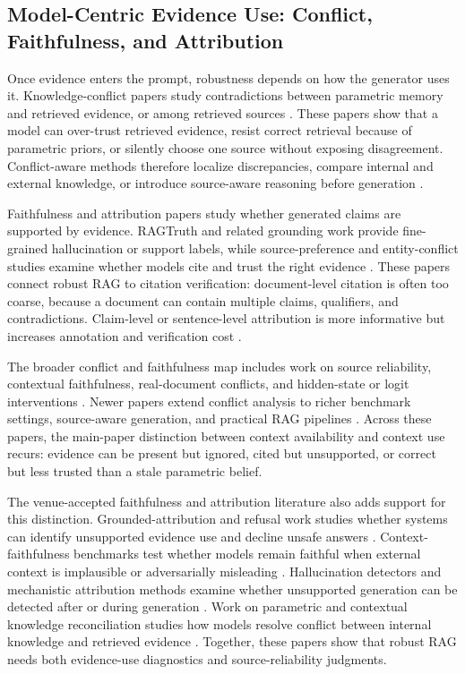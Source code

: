 \documentclass[11pt]{article}
\begin{document}
\subsection{Model-Centric Evidence Use: Conflict, Faithfulness, and Attribution}

Once evidence enters the prompt, robustness depends on how the generator uses it. Knowledge-conflict papers study contradictions between parametric memory and retrieved evidence, or among retrieved sources \citep{tugOfWar2024,faithfulRAG2025,astuteRAG2025,rrag046}. These papers show that a model can over-trust retrieved evidence, resist correct retrieval because of parametric priors, or silently choose one source without exposing disagreement. Conflict-aware methods therefore localize discrepancies, compare internal and external knowledge, or introduce source-aware reasoning before generation \citep{rrag008,rrag013,rrag017,rrag024,rrag029,rrag031,rrag036,rrag038}.

Faithfulness and attribution papers study whether generated claims are supported by evidence. RAGTruth and related grounding work provide fine-grained hallucination or support labels, while source-preference and entity-conflict studies examine whether models cite and trust the right evidence \citep{ragTruth2024,rrag110,rrag112,rrag115,rrag132}. These papers connect robust RAG to citation verification: document-level citation is often too coarse, because a document can contain multiple claims, qualifiers, and contradictions. Claim-level or sentence-level attribution is more informative but increases annotation and verification cost \citep{rrag076,rrag077,rrag082,rrag086,rrag089,rrag092,rrag100}.

The broader conflict and faithfulness map includes work on source reliability, contextual faithfulness, real-document conflicts, and hidden-state or logit interventions \citep{rrag118,rrag130,rrag147,rrag150,rrag152,rrag163,rrag176,rrag187}. Newer papers extend conflict analysis to richer benchmark settings, source-aware generation, and practical RAG pipelines \citep{rrag202,rrag204,rrag207,rrag209,rrag214,rrag216,rrag220,rrag222,rrag223,rrag227}. Across these papers, the main-paper distinction between context availability and context use recurs: evidence can be present but ignored, cited but unsupported, or correct but less trusted than a stale parametric belief.

The venue-accepted faithfulness and attribution literature also adds support for this distinction. Grounded-attribution and refusal work studies whether systems can identify unsupported evidence use and decline unsafe answers \citep{venueAcc001}. Context-faithfulness benchmarks test whether models remain faithful when external context is implausible or adversarially misleading \citep{rrag040}. Hallucination detectors and mechanistic attribution methods examine whether unsupported generation can be detected after or during generation \citep{venueAcc020,venueAcc026}. Work on parametric and contextual knowledge reconciliation studies how models resolve conflict between internal knowledge and retrieved evidence \citep{venueAcc027}. Together, these papers show that robust RAG needs both evidence-use diagnostics and source-reliability judgments.
\end{document}
